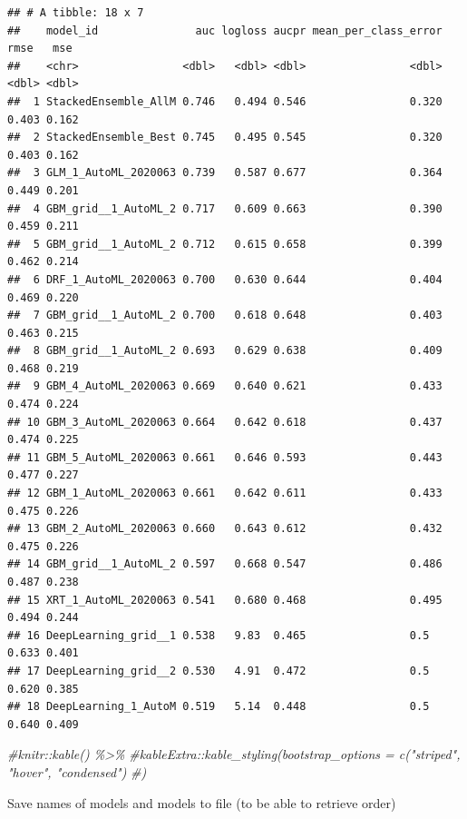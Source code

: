\documentclass[
]{article}
\newenvironment{Shaded}{\begin{snugshade}}{\end{snugshade}}
\newcommand{\CommentTok}[1]{\textcolor[rgb]{0.56,0.35,0.01}{\textit{#1}}}
\begin{document}
\begin{verbatim}
## # A tibble: 18 x 7
##    model_id               auc logloss aucpr mean_per_class_error  rmse   mse
##    <chr>                <dbl>   <dbl> <dbl>                <dbl> <dbl> <dbl>
##  1 StackedEnsemble_AllM 0.746   0.494 0.546                0.320 0.403 0.162
##  2 StackedEnsemble_Best 0.745   0.495 0.545                0.320 0.403 0.162
##  3 GLM_1_AutoML_2020063 0.739   0.587 0.677                0.364 0.449 0.201
##  4 GBM_grid__1_AutoML_2 0.717   0.609 0.663                0.390 0.459 0.211
##  5 GBM_grid__1_AutoML_2 0.712   0.615 0.658                0.399 0.462 0.214
##  6 DRF_1_AutoML_2020063 0.700   0.630 0.644                0.404 0.469 0.220
##  7 GBM_grid__1_AutoML_2 0.700   0.618 0.648                0.403 0.463 0.215
##  8 GBM_grid__1_AutoML_2 0.693   0.629 0.638                0.409 0.468 0.219
##  9 GBM_4_AutoML_2020063 0.669   0.640 0.621                0.433 0.474 0.224
## 10 GBM_3_AutoML_2020063 0.664   0.642 0.618                0.437 0.474 0.225
## 11 GBM_5_AutoML_2020063 0.661   0.646 0.593                0.443 0.477 0.227
## 12 GBM_1_AutoML_2020063 0.661   0.642 0.611                0.433 0.475 0.226
## 13 GBM_2_AutoML_2020063 0.660   0.643 0.612                0.432 0.475 0.226
## 14 GBM_grid__1_AutoML_2 0.597   0.668 0.547                0.486 0.487 0.238
## 15 XRT_1_AutoML_2020063 0.541   0.680 0.468                0.495 0.494 0.244
## 16 DeepLearning_grid__1 0.538   9.83  0.465                0.5   0.633 0.401
## 17 DeepLearning_grid__2 0.530   4.91  0.472                0.5   0.620 0.385
## 18 DeepLearning_1_AutoM 0.519   5.14  0.448                0.5   0.640 0.409
\end{verbatim}

\begin{Shaded}
\begin{Highlighting}[]
  \CommentTok{\#knitr::kable() \%\textgreater{}\%}
  \CommentTok{\#kableExtra::kable\_styling(bootstrap\_options = c("striped", "hover", "condensed")}
\CommentTok{\#)}
\end{Highlighting}
\end{Shaded}

Save names of models and models to file (to be able to retrieve order)
\end{document}
